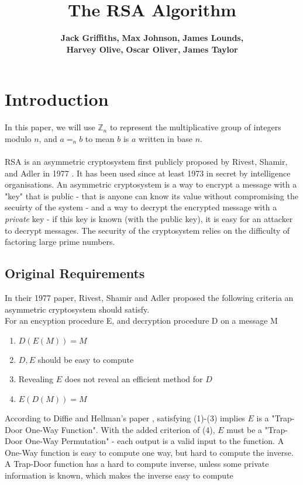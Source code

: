 \documentclass{article}
\author{
    {\bf Jack Griffiths,}
    {\bf Max Johnson,}
    {\bf James Lounds, } \\
    {\bf Harvey Olive, }
    {\bf Oscar Oliver, }
    {\bf James Taylor}
}
\title{The RSA Algorithm}
\begin{document}
\maketitle
\newpage
\tableofcontents
\newpage
\section{Introduction}
In this paper, we will use $\mathbb{Z}_n$ to represent the multiplicative group of integers modulo $n$, and $a =_n b$ to mean $b$ is $a$ written in base $n$. \\\\
RSA is an asymmetric cryptosystem first publicly proposed by Rivest, Shamir, and Adler in 1977 \cite{RSA}.
It has been used since at least 1973 in secret by intelligence organisations.
An asymmetric cryptosystem is a way to encrypt a message with a "key" that is public -
that is anyone can know its value without compromising the secuirty of the system -
and a way to decrypt the encrypted message with a \emph{private} key -
if this key is known (with the public key), it is easy for an attacker to decrypt messages.
The security of the cryptosystem relies on the difficulty of factoring large prime numbers.
\subsection{Original Requirements}
In their 1977 paper, Rivest, Shamir and Adler proposed
the following criteria an asymmetric cryptosystem should satisfy.
\\For an encyption procedure E, and decryption procedure D on a message M
\begin{enumerate}
    \item $D(E(M)) = M$
    \item $D, E$ should be easy to compute
    \item Revealing $E$ does not reveal an efficient method for $D$
    \item $E(D(M)) = M$
\end{enumerate}
According to Diffie and Hellman's paper \cite{Directions},
satisfying (1)-(3) implies $E$ is a "Trap-Door One-Way Function".
With the added criterion of (4), $E$ must be  a "Trap-Door One-Way Permutation" -
each output is a valid input to the function.
A One-Way function is easy to compute one way, but hard to compute the inverse.
A Trap-Door function has a hard to compute inverse,
unless some private information is known, which makes the inverse easy to compute
\end{document}

